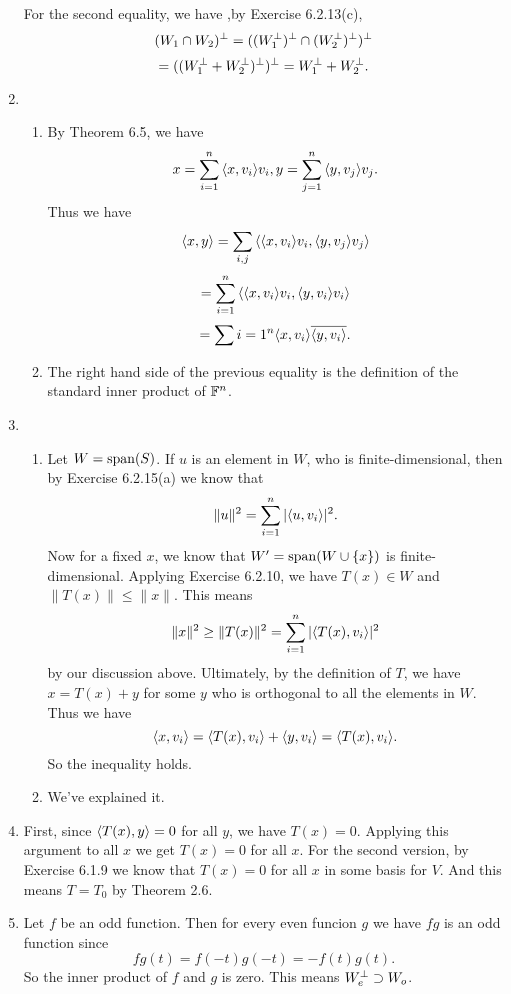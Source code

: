 \begin{enumerate}
For the second equality, we have ,by Exercise 6.2.13(c), 
\[(W_1\cap W_2)\pp =((W_1\pp)\pp\cap (W_2\pp )\pp )\pp \]
\[=((W_1\pp+W_2\pp)\pp )\pp=W_1\pp+W_2\pp .\]
\item \begin{enumerate}
\item By Theorem 6.5, we have 
\[x=\sum_{i=1}^n{\lag x,v_i\rag v_i},y=\sum_{j=1}^n{\lag y,v_j\rag v_j}.\]
Thus we have 
\[\lag x,y\rag =\sum_{i,j}{\lag \lag x,v_i\rag v_i,\lag y,v_j\rag v_j \rag }\]
\[=\sum_{i=1}^n{\lag \lag x,v_i\rag v_i,\lag y,v_i\rag v_i \rag }\]
\[=\sum{i=1}^n{\lag x,v_i\rag \overline{\lag y,v_i\rag}}.\]
\item The right hand side of the previous equality is the definition of the standard inner product of $\F^n$.
\end{enumerate}
\item \begin {enumerate}
\item Let $W=\sp(S)$. If $u$ is an element in $W$, who is finite-dimensional, then by Exercise 6.2.15(a) we know that 
\[\|u\|^2=\sum_{i=1}^n{|\lag u,v_i\rag |^2}.\]
Now for a fixed $x$, we know that $W'=\sp(W\cup \{x\})$ is finite-dimensional. Applying Exercise 6.2.10, we have $T(x)\in W$ and $\|T(x)\|\leq \|x\|$. This means 
\[\|x\|^2\geq \|T(x)\|^2=\sum_{i=1}^n{|\lag T(x),v_i\rag |^2}\]
by our discussion above. Ultimately, by the definition of $T$, we have $x=T(x)+y$ for some $y$ who is orthogonal to all the elements in $W$. Thus we have 
\[\lag x,v_i\rag =\lag T(x),v_i\rag +\lag y,v_i\rag =\lag T(x),v_i\rag .\]
So the inequality holds.
\item We've explained it.
\end{enumerate}
\item First, since $\lag T(x),y\rag =0$ for all $y$, we have $T(x)=0$. Applying this argument to all $x$ we get $T(x)=0$ for all $x$. For the second version, by Exercise 6.1.9 we know that $T(x)=0$ for all $x$ in some basis for $V$. And this means $T=T_0$ by Theorem 2.6.
\item Let $f$ be an odd function. Then for every even funcion $g$ we have $fg$ is an odd function since 
\[fg(t)=f(-t)g(-t)=-f(t)g(t).\]
So the inner product of $f$ and $g$ is zero. This means $W_e\pp\supset W_o$. 


\end{enumerate}
